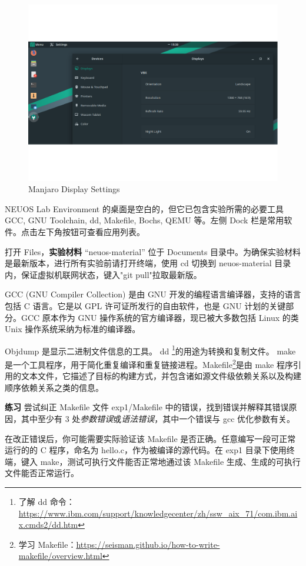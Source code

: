 \begin{figure}[htbp]
    \centering
    \includegraphics[width=\textwidth]{img/ManjaroDisplaySettings}
    \caption{Manjaro Display Settings}
    \label{fig:Manjaro Display Settings}
\end{figure}

NEUOS Lab Environment 的桌面是空白的，但它已包含实验所需的必要工具 GCC, GNU Toolchain, dd, Makefile, Bochs, QEMU 等。左侧 Dock 栏是常用软件。点击左下角按钮可查看应用列表。

打开 Files，\textbf{实验材料} “neuos-material” 位于 Documents 目录中。为确保实验材料是最新版本，进行所有实验前请打开终端，使用 cd 切换到 neuos-material 目录内，保证虚拟机联网状态，键入"git pull"拉取最新版。

GCC (GNU Compiler Collection) 是由 GNU 开发的编程语言编译器，支持的语言包括 C 语言。它是以 GPL 许可证所发行的自由软件，也是 GNU 计划的关键部分。GCC 原本作为 GNU 操作系统的官方编译器，现已被大多数包括 Linux 的类 Unix 操作系统采纳为标准的编译器。

Objdump 是显示二进制文件信息的工具。
dd \footnote{了解 dd 命令：\url{https://www.ibm.com/support/knowledgecenter/zh/ssw_aix_71/com.ibm.aix.cmds2/dd.htm}}的用途为转换和复制文件。
make 是一个工具程序，用于简化重复编译和重复链接进程。Makefile\footnote{学习 Makefile：\url{https://seisman.github.io/how-to-write-makefile/overview.html}}是由 make 程序引用的文本文件，它描述了目标的构建方式，并包含诸如源文件级依赖关系以及构建顺序依赖关系之类的信息。

\begin{mdframed}[hidealllines=true,backgroundcolor=gray!20]
\textbf{练习 } 尝试纠正 Makefile 文件 exp1/Makefile 中的错误，找到错误并解释其错误原因，其中至少有 3 处\textit{参数错误}或\textit{语法错误}，其中一个错误与 gcc 优化参数有关。

在改正错误后，你可能需要实际验证该 Makefile 是否正确。任意编写一段可正常运行的的 C 程序，命名为 hello.c，作为被编译的源代码。在 exp1 目录下使用终端，键入 make，测试可执行文件能否正常地通过该 Makefile 生成、生成的可执行文件能否正常运行。
\end{mdframed}

